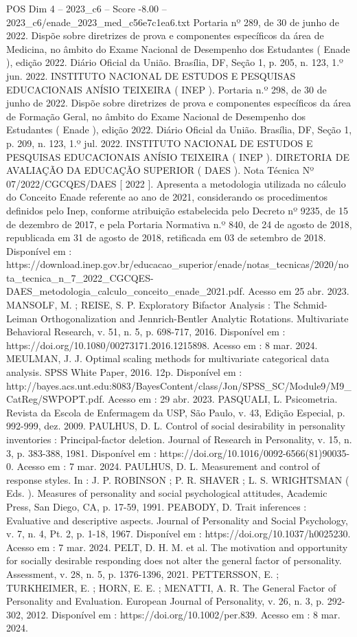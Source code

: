 \begin{textsample}{POS Dim 4 – 2023\_c6 – Score -8.00 – 2023\_c6/enade\_2023\_med\_c56e7c1ea6.txt}
Portaria nº 289, de 30 de junho de 2022.
Dispõe sobre diretrizes de prova e componentes específicos da área de Medicina, no âmbito do Exame Nacional de Desempenho dos Estudantes ( Enade ), edição 2022.
Diário Oficial da União.
Brasília, DF, Seção 1, p. 205, n. 123, 1.º jun. 2022.
INSTITUTO NACIONAL DE ESTUDOS E PESQUISAS EDUCACIONAIS ANÍSIO TEIXEIRA ( INEP ).
Portaria n.º 298, de 30 de junho de 2022.
Dispõe sobre diretrizes de prova e componentes específicos da área de Formação Geral, no âmbito do Exame Nacional de Desempenho dos Estudantes ( Enade ), edição 2022.
Diário Oficial da União.
Brasília, DF, Seção 1, p. 209, n. 123, 1.º jul. 2022.
INSTITUTO NACIONAL DE ESTUDOS E PESQUISAS EDUCACIONAIS ANÍSIO TEIXEIRA ( INEP ).
DIRETORIA DE AVALIAÇÃO DA EDUCAÇÃO SUPERIOR ( DAES ).
Nota Técnica Nº 07/2022/CGCQES/DAES [ 2022 ].
Apresenta a metodologia utilizada no cálculo do Conceito Enade referente ao ano de 2021, considerando os procedimentos definidos pelo Inep, conforme atribuição estabelecida pelo Decreto nº 9235, de 15 de dezembro de 2017, e pela Portaria Normativa n.º 840, de 24 de agosto de 2018, republicada em 31 de agosto de 2018, retificada em 03 de setembro de 2018.
Disponível em : https://download.inep.gov.br/educacao\_superior/enade/notas\_tecnicas/2020/nota\_tecnica\_n\_7\_2022\_CGCQES-DAES\_metodologia\_calculo\_conceito\_enade\_2021.pdf.
Acesso em 25 abr. 2023.
MANSOLF, M. ; REISE, S.
P.
Exploratory Bifactor Analysis : The Schmid-Leiman Orthogonalization and Jennrich-Bentler Analytic Rotations.
Multivariate Behavioral Research, v. 51, n. 5, p. 698-717, 2016.
Disponível em : https://doi.org/10.1080/00273171.2016.1215898.
Acesso em : 8 mar. 2024.
MEULMAN, J.
J.
Optimal scaling methods for multivariate categorical data analysis.
SPSS White Paper, 2016. 12p.
Disponível em : http://bayes.acs.unt.edu:8083/BayesContent/class/Jon/SPSS\_SC/Module9/M9\_CatReg/SWPOPT.pdf.
Acesso em : 29 abr. 2023.
PASQUALI, L.
Psicometria.
Revista da Escola de Enfermagem da USP, São Paulo, v. 43, Edição Especial, p. 992-999, dez. 2009.
PAULHUS, D.
L.
Control of social desirability in personality inventories : Principal-factor deletion.
Journal of Research in Personality, v. 15, n. 3, p. 383-388, 1981.
Disponível em : https://doi.org/10.1016/0092-6566(81)90035-0.
Acesso em : 7 mar. 2024.
PAULHUS, D.
L.
Measurement and control of response styles.
In : J.
P.
ROBINSON ; P.
R.
SHAVER ; L.
S.
WRIGHTSMAN ( Eds. ).
Measures of personality and social psychological attitudes, Academic Press, San Diego, CA, p. 17-59, 1991.
PEABODY, D.
Trait inferences : Evaluative and descriptive aspects.
Journal of Personality and Social Psychology, v. 7, n. 4, Pt. 2, p. 1-18, 1967.
Disponível em : https://doi.org/10.1037/h0025230.
Acesso em : 7 mar. 2024.
PELT, D.
H.
M. et al.
The motivation and opportunity for socially desirable responding does not alter the general factor of personality.
Assessment, v. 28, n. 5, p. 1376-1396, 2021.
PETTERSSON, E. ; TURKHEIMER, E. ; HORN, E.
E. ; MENATTI, A.
R.
The General Factor of Personality and Evaluation.
European Journal of Personality, v. 26, n. 3, p. 292-302, 2012.
Disponível em : https://doi.org/10.1002/per.839.
Acesso em : 8 mar. 2024.

\end{textsample}
